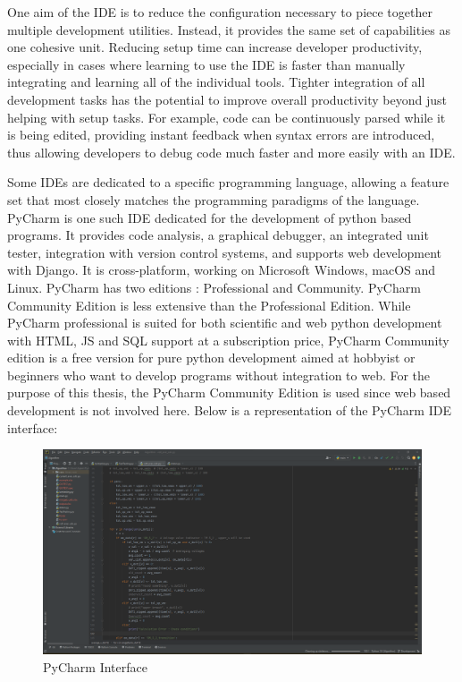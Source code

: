 One aim of the IDE is to reduce the configuration necessary to piece together multiple development utilities. Instead, it provides the same set of capabilities as one cohesive unit. Reducing setup time can increase developer productivity, especially in cases where learning to use the IDE is faster than manually integrating and learning all of the individual tools. Tighter integration of all development tasks has the potential to improve overall productivity beyond just helping with setup tasks. For example, code can be continuously parsed while it is being edited, providing instant feedback when syntax errors are introduced, thus allowing developers to debug code much faster and more easily with an IDE.

Some IDEs are dedicated to a specific programming language, allowing a feature set that most closely matches the programming paradigms of the language.\cite{PyWiki} PyCharm is one such IDE dedicated for the development of python based programs. It provides code analysis, a graphical debugger, an integrated unit tester, integration with version control systems, and supports web development with Django. It is cross-platform, working on Microsoft Windows, macOS and Linux. PyCharm has two editions : Professional and Community. PyCharm Community Edition is less extensive than the Professional Edition. While PyCharm professional is suited for both scientific and web python development with HTML, JS and SQL support at a subscription price, PyCharm Community edition is a free version for pure python development aimed at hobbyist or beginners who want to develop programs without integration to web. For the purpose of this thesis, the PyCharm Community Edition is used since web based development is not involved here. Below is a representation of the PyCharm IDE interface:

\begin{figure}[h]
    \centering
    \includegraphics[width= 1\textwidth]{images/pycharm.png}
    \caption [PyCharm]{PyCharm Interface}  
    \label{fig:Pycharm interface}
\end{figure}


